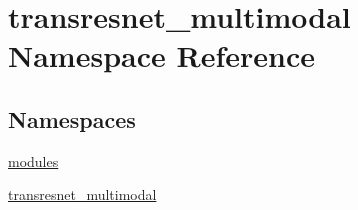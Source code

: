 \hypertarget{namespacetransresnet__multimodal}{}\section{transresnet\+\_\+multimodal Namespace Reference}
\label{namespacetransresnet__multimodal}
\subsection*{Namespaces}
\begin{DoxyCompactItemize}
\item 
 \hyperlink{namespacetransresnet__multimodal_1_1modules}{modules}
\item 
 \hyperlink{namespacetransresnet__multimodal_1_1transresnet__multimodal}{transresnet\+\_\+multimodal}
\end{DoxyCompactItemize}
